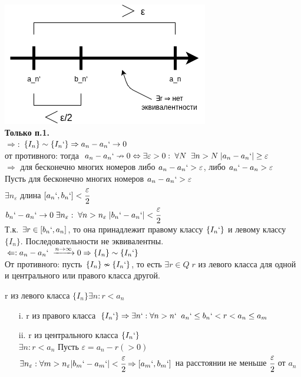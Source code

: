 \documentclass[12pt, paper]{article}
\newcommand{\eps}{\varepsilon}
\begin{document}
\begin{tcolorbox}[title=Доказательство Т1, breakable]
\includegraphics[width=0.4\linewidth]{images/Дедекиндовы сечения/Доказательство Т1.png}\\
\textbf{Только п.1.} \\
$\Rightarrow$: $\{ I_n \} \sim \{ I_n` \} \Rightarrow a_n-a_n` \rightarrow 0$\\
от противного: тогда $a_n-a_n` \nrightarrow 0 \Leftrightarrow \\ 
\exists \eps>0:\; \forall N\;\; \exists n > N\; |a_n - a_n`| \geq \eps $ \\
$\Rightarrow $ для бесконечно многих номеров либо $a_n-a_n` > \eps$, либо $a_n` - a_n > \eps$\\
Пусть для бесконечно многих номеров $a_n - a_n` > \eps$ \\
$\exists n_\eps$ длина $[a_n`, b_n`] < \cfrac{\eps}{2}$\\
$b_n`-a_n` \rightarrow 0 \; \exists n_\eps: \; \forall n > n_\eps\; |b_n`-a_n`| < \cfrac{\eps}{2}$\\
Т.к. $\exists r \in [b_n`, a_n]$, то она принадлежит правому классу $\{I_n`\}$ и левому классу $\{I_n\}$. Последовательности не эквивалентны.\\

$\Leftarrow: a_n - a_n`\; \xrightarrow{n\rightarrow \infty} 0 \Rightarrow \{ I_n \} \sim \{ I_n` \}$\\
От противного: пусть $\{ I_n \} \nsim \{ I_n` \}$, то есть $\exists r \in Q\; r$ из левого класса для одной и центрального или правого класса другой.

r из левого класса $\{ I_n \} \exists n: r < a_n$
\begin{enumerate}
    \item[i.] r из правого класса $\{ I_n` \} \Rightarrow \exists n`: \forall n > n`\;\; a_n` \leq b_n` < r < a_n \leq a_m$\\
    \item[ii.] r из центрального класса $\{ I_n` \}$\\
    $\exists n: r < a_n$ Пусть $\eps = a_n - r(>0)$\\
    $\exists n_\eps: \forall m > n_\eps |b_m`-a_m`| < \cfrac{\eps}{2} \Rightarrow [a_m`,b_m`]$ на расстоянии не меньше $\cfrac{\eps}{2}$ от $a_n$
\end{enumerate}


\end{tcolorbox}
\end{document}
